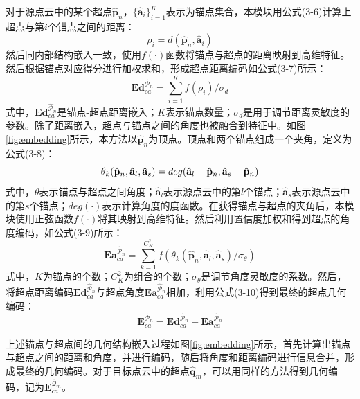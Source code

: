     对于源点云中的某个超点$\hat{\mathbf{p}}_{n}$，$\{\hat{\mathbf{a}}_i\}_{i=1}^K$表示为锚点集合，本模块用公式(3-6)计算上超点与第$i$个锚点之间的距离：
    \begin{equation}
        \rho_{i} = d(\hat{\mathbf{p}}_{n},\hat{\mathbf{a}}_i)
    \end{equation}
    然后同内部结构嵌入一致，使用$f(\cdot)$函数将锚点与超点的距离映射到高维特征。然后根据锚点对应得分进行加权求和，形成超点距离编码如公式(3-7)所示：
    \begin{equation}
        \mathbf{Ed}_{ca}^{\mathcal{\hat{P}}_{n}}=  \sum_{i=1}^{K} {f(\rho_{i})/\sigma_{d}}
    \end{equation}
    式中，$\mathbf{Ed}_{ca}^{\mathcal{\hat{P}}_{n}}$是锚点-超点距离嵌入；$K$表示锚点数量；$\sigma_{d}$是用于调节距离灵敏度的参数。除了距离嵌入，超点与锚点之间的角度也被融合到特征中。如图\ref{fig:embedding}所示，本方法以$\hat{\mathbf{p}}_n$为顶点。顶点和两个锚点组成一个夹角，定义为公式(3-8)：
    \begin{equation}
        \centering
        \theta_k(\mathbf{\hat{p}}_n, \mathbf{\hat{a}}_l, \mathbf{\hat{a}}_s)= deg(\mathbf{\hat{a}}_l-\mathbf{\hat{p}}_n,\mathbf{\hat{a}}_s - \mathbf{\hat{p}}_n)
    \end{equation}
    式中，$\theta$表示锚点与超点之间角度；$\mathbf{\hat{a}}_l$表示源点云中的第$l$个锚点；$\mathbf{\hat{a}}_s$表示源点云中的第$s$个锚点；$deg(\cdot)$表示计算角度的度函数。在获得锚点与超点的夹角后，本模块使用正弦函数$f(\cdot)$将其映射到高维特征。然后利用置信度加权和得到超点的角度编码，如公式(3-9)所示：
    \begin{equation}
        \mathbf{Ea}_{ca}^{\mathcal{\hat{P}}_{n}} = \sum_{k = 1}^{C_K^2} f(\theta_k(\mathbf{\hat{p}}_{n}, \mathbf{\hat{a}}_l, \mathbf{\hat{a}}_s)/\sigma_\theta)
    \end{equation}
    式中，$K$为锚点的个数；$C_K^2$为组合的个数；$\sigma_\theta$是调节角度灵敏度的系数。然后，将超点距离编码$\mathbf{Ed}_{ca}^{\mathcal{\hat{P}}_n}$与超点角度$\mathbf{Ea}_{ca}^{\mathcal{\hat{P}}_n}$相加，利用公式(3-10)得到最终的超点几何编码：
    \begin{equation}
        \mathbf{E}_{ca}^{\mathcal{\hat{P}}_{n}} =  \mathbf{Ed}_{ca}^{\mathcal{\hat{P}}_{n}} + \mathbf{Ea}_{ca}^{\mathcal{\hat{P}}_{n}}
    \end{equation}

    上述锚点与超点间的几何结构嵌入过程如图\ref{fig:embedding}所示，首先计算出锚点与超点之间的距离和角度，并进行编码，随后将角度和距离编码进行信息合并，形成最终的几何编码。对于目标点云中的超点$\mathbf{\hat{q}}_m$，可以用同样的方法得到几何编码，记为$\mathbf{E}_{ca}^{\mathcal{\hat{Q}}_m}$。\par

